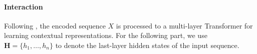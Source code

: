 \documentclass[letterpaper]{article} %
\begin{document}
\paragraph{Interaction}
Following \citet{devlin2018bert}, the encoded sequence $X$ is processed to a multi-layer Transformer \cite{DBLP:conf/nips/VaswaniSPUJGKP17} for learning contextual representations. For the following part, we use $\textbf{H} = \{h_1, \dots, h_n\}$ to denote the last-layer hidden states of the input sequence.

\end{document}
